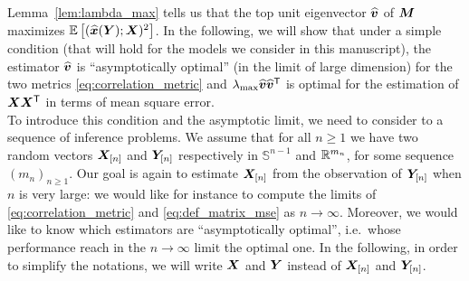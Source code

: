 \documentclass[12pt,nocut]{article}
\begin{document}

Lemma~\ref{lem:lambda_max} tells us that the top unit eigenvector $\widehat{{\boldsymbol v}}$ of ${\boldsymbol M}$ maximizes $\mathbb{E}\left[(\widehat{{\boldsymbol x}}({\boldsymbol Y}); {\boldsymbol X})^2\right]$.
In the following, we will show that under a simple condition (that will hold for the models we consider in this manuscript), the estimator $\widehat{{\boldsymbol v}}$ is ``asymptotically optimal'' (in the limit of large dimension) for the two metrics \eqref{eq:correlation_metric} and $\lambda_{\rm max} \widehat{{\boldsymbol v}} \widehat{{\boldsymbol v}}^{{\sf T}}$ is optimal for the estimation of ${\boldsymbol X}{\boldsymbol X}^{{\sf T}}$ in terms of mean square error.
\\

To introduce this condition and the asymptotic limit, we need to consider to a sequence of inference problems. We assume that for all $n \geq 1$ we have two random vectors ${\boldsymbol X}_{[n]}$ and ${\boldsymbol Y}_{[n]}$ respectively in $\mathbb{S}^{n-1}$ and $\mathbb{R}^{m_n}$, for some sequence $(m_n)_{n \geq 1}$. Our goal is again to estimate ${\boldsymbol X}_{[n]}$ from the observation of ${\boldsymbol Y}_{[n]}$ when $n$ is very large: we would like for instance to compute the limits of \eqref{eq:correlation_metric} and \eqref{eq:def_matrix_mse} as $n \to \infty$.
Moreover, we would like to know which estimators are ``asymptotically optimal'', i.e.\ whose performance reach in the $n \to \infty$ limit the optimal one.
In the following, in order to simplify the notations, we will write ${\boldsymbol X}$ and ${\boldsymbol Y}$ instead of ${\boldsymbol X}_{[n]}$ and ${\boldsymbol Y}_{[n]}$.
\end{document}
